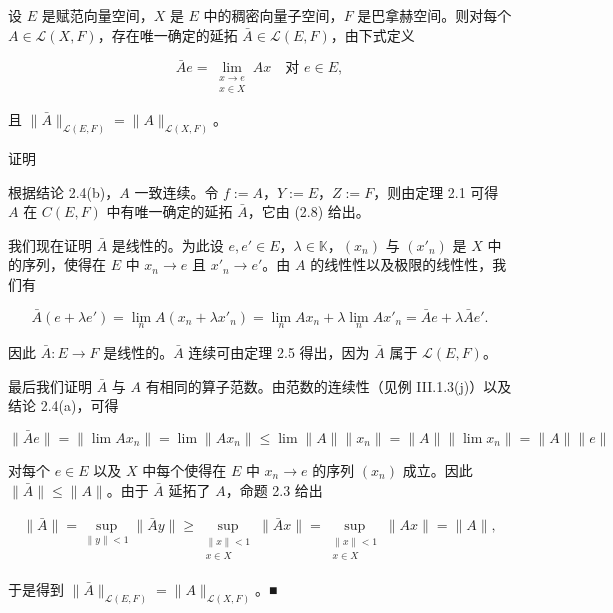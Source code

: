 \begin{theorem}

设 $ E $ 是赋范向量空间，$ X $ 是 $ E $ 中的稠密向量子空间，$ F $ 是巴拿赫空间。则对每个 $ A \in \mathcal{L}(X, F) $，存在唯一确定的延拓 $ \bar{A} \in \mathcal{L}(E, F) $，由下式定义

\begin{equation}
\bar{A}e = \lim_{\substack{x \to e \\ x \in X}} Ax \quad \text{对 } e \in E,\tag{2.8}
\end{equation}

且 $ \|\bar{A}\|_{\mathcal{L}(E, F)} = \|A\|_{\mathcal{L}(X, F)} $。

证明

\begin{subitems}
\item

根据结论 2.4(b)，$ A $ 一致连续。令 $ f := A $，$ Y := E $，$ Z := F $，则由定理 2.1 可得 $ A $ 在 $ C(E, F) $ 中有唯一确定的延拓 $ \bar{A} $，它由 (2.8) 给出。

\item

我们现在证明 $ \bar{A} $ 是线性的。为此设 $ e, e' \in E $，$ \lambda \in \mathbb{K} $，$ (x_n) $ 与 $ (x'_n) $ 是 $ X $ 中的序列，使得在 $ E $ 中 $ x_n \to e $ 且 $ x'_n \to e' $。由 $ A $ 的线性性以及极限的线性性，我们有

\[
\bar{A}(e + \lambda e') = \lim_n A(x_n + \lambda x'_n) = \lim_n Ax_n + \lambda \lim_n Ax'_n = \bar{A}e + \lambda \bar{A}e'.
\]

因此 $ \bar{A} : E \to F $ 是线性的。$ \bar{A} $ 连续可由定理 2.5 得出，因为 $ \bar{A} $ 属于 $ \mathcal{L}(E, F) $。

\item

最后我们证明 $ \bar{A} $ 与 $ A $ 有相同的算子范数。由范数的连续性（见例 III.1.3(j)）以及结论 2.4(a)，可得

\[
\|\bar{A}e\| = \|\lim Ax_n\| = \lim \|Ax_n\| \le \lim \|A\| \|x_n\| = \|A\| \|\lim x_n\| = \|A\| \|e\|
\]

对每个 $ e \in E $ 以及 $ X $ 中每个使得在 $ E $ 中 $ x_n \to e $ 的序列 $ (x_n) $ 成立。因此 $ \|\bar{A}\| \le \|A\| $。由于 $ \bar{A} $ 延拓了 $ A $，命题 2.3 给出

\begin{equation*}
\begin{aligned}
\|\bar{A}\| = \sup_{\|y\| < 1} \|\bar{A}y\| \ge \sup_{\substack{\|x\| < 1 \\ x \in X}} \|\bar{A}x\| = \sup_{\substack{\|x\| < 1 \\ x \in X}} \|Ax\| = \|A\|,
\end{aligned}
\end{equation*}

于是得到 $ \|\bar{A}\|_{\mathcal{L}(E, F)} = \|A\|_{\mathcal{L}(X, F)} $。\nobreak\hspace{0.35em}■

\end{subitems}

\end{theorem}

